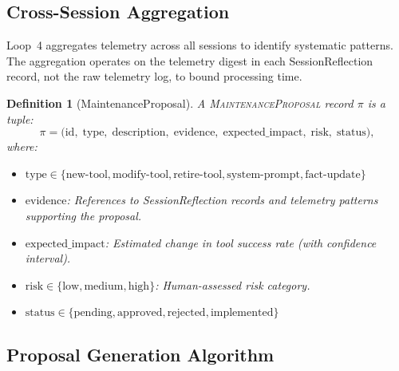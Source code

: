 \documentclass[11pt]{article}
\newtheorem{definition}{Definition}
\begin{document}
\subsection{Cross-Session Aggregation}

Loop~4 aggregates telemetry across all sessions to identify systematic patterns.
The aggregation operates on the telemetry digest in each SessionReflection record,
not the raw telemetry log, to bound processing time.

\begin{definition}[MaintenanceProposal]
\label{def:maintenance_proposal}
A \textsc{MaintenanceProposal} record $\pi$ is a tuple:
\begin{equation}
\pi = \bigl( \text{id},\; \text{type},\; \text{description},\; \text{evidence},\;
             \text{expected\_impact},\; \text{risk},\; \text{status} \bigr),
\end{equation}
where:
\begin{itemize}[leftmargin=1.5em, nosep]
    \item $\text{type} \in \{\text{new-tool}, \text{modify-tool}, \text{retire-tool}, \text{system-prompt}, \text{fact-update}\}$
    \item $\text{evidence}$: References to SessionReflection records and telemetry patterns supporting the proposal.
    \item $\text{expected\_impact}$: Estimated change in tool success rate (with confidence interval).
    \item $\text{risk} \in \{\text{low}, \text{medium}, \text{high}\}$: Human-assessed risk category.
    \item $\text{status} \in \{\text{pending}, \text{approved}, \text{rejected}, \text{implemented}\}$
\end{itemize}
\end{definition}

\subsection{Proposal Generation Algorithm}
\end{document}
